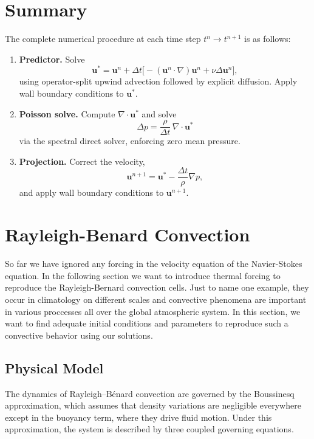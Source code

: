 \section{Summary}
The complete numerical procedure at each time step $t^n \to t^{n+1}$
is as follows:
\begin{enumerate}
    \item \textbf{Predictor.} Solve
          \begin{equation*}
              \mathbf{u}^* = \mathbf{u}^n + \Delta t\bigl[
              -(\mathbf{u}^n\cdot\nabla)\mathbf{u}^n
              + \nu\Delta\mathbf{u}^n\bigr],
          \end{equation*}
          using operator-split upwind advection followed by explicit
          diffusion. Apply wall boundary conditions to $\mathbf{u}^*$.
    \item \textbf{Poisson solve.} Compute
          $\nabla\cdot\mathbf{u}^*$ and solve
          \begin{equation*}
              \Delta p = \frac{\rho}{\Delta t}\,\nabla\cdot\mathbf{u}^*
          \end{equation*}
          via the spectral direct solver, enforcing zero mean pressure.
    \item \textbf{Projection.} Correct the velocity,
          \begin{equation*}
              \mathbf{u}^{n+1} = \mathbf{u}^*
              - \frac{\Delta t}{\rho}\nabla p,
          \end{equation*}
          and apply wall boundary conditions to $\mathbf{u}^{n+1}$.
\end{enumerate}





\section{Rayleigh-Benard Convection}
So far we have ignored any forcing in the velocity equation of the Navier-Stokes equation. In
the following section we want to introduce thermal forcing to reproduce the Rayleigh-Bernard
convection cells. Just to name one example, they occur in climatology on different scales and
convective phenomena are important in various proccesses all over the global atmospheric
system. In this section, we want to find adequate initial conditions and parameters to
reproduce such a convective behavior using our solutions.
\subsection{Physical Model}
The dynamics of Rayleigh--Bénard convection are governed by the Boussinesq approximation, which assumes that density variations are negligible everywhere except in the buoyancy term, where they drive fluid motion. Under this approximation, the system is described by three coupled governing equations. 

